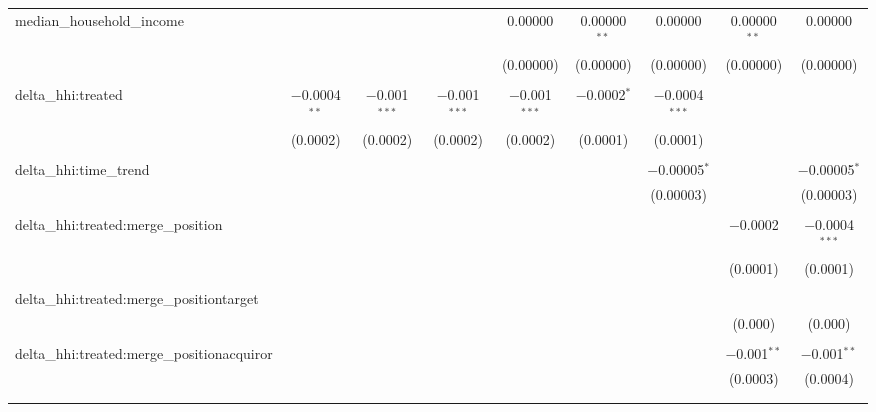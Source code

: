 \begin{table}[H]
{\begin{tabular}{@{\extracolsep{5pt}}lcccccccc}
  median\_household\_income &  &  &  & 0.00000 & 0.00000$^{**}$ & 0.00000 & 0.00000$^{**}$ & 0.00000 \\  

   &  &  &  & (0.00000) & (0.00000) & (0.00000) & (0.00000) & (0.00000) \\  

   & & & & & & & & \\  

  delta\_hhi:treated & $-$0.0004$^{**}$ & $-$0.001$^{***}$ & $-$0.001$^{***}$ & $-$0.001$^{***}$ & $-$0.0002$^{*}$ & $-$0.0004$^{***}$ &  &  \\  

   & (0.0002) & (0.0002) & (0.0002) & (0.0002) & (0.0001) & (0.0001) &  &  \\  

   & & & & & & & & \\  

  delta\_hhi:time\_trend &  &  &  &  &  & $-$0.00005$^{*}$ &  & $-$0.00005$^{*}$ \\  

   &  &  &  &  &  & (0.00003) &  & (0.00003) \\  

   & & & & & & & & \\  

  delta\_hhi:treated:merge\_position &  &  &  &  &  &  & $-$0.0002 & $-$0.0004$^{***}$ \\  

   &  &  &  &  &  &  & (0.0001) & (0.0001) \\  

   & & & & & & & & \\  

  delta\_hhi:treated:merge\_positiontarget &  &  &  &  &  &  &  &  \\  

   &  &  &  &  &  &  & (0.000) & (0.000) \\  

   & & & & & & & & \\  

  delta\_hhi:treated:merge\_positionacquiror &  &  &  &  &  &  & $-$0.001$^{**}$ & $-$0.001$^{**}$ \\  

   &  &  &  &  &  &  & (0.0003) & (0.0004) \\  

   & & & & & & & & \\  

 \hline \\[-1.8ex]  


\end{tabular}}
\end{table}
